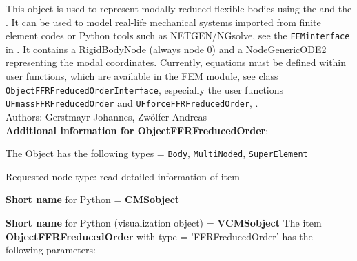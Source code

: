 \label{sec:item:ObjectFFRFreducedOrder}
This object is used to represent modally reduced flexible bodies using the  and the . It can be used to model real-life mechanical systems imported from finite element codes or Python tools such as NETGEN/NGsolve, see the \texttt{FEMinterface} in . It contains a RigidBodyNode (always node 0) and a NodeGenericODE2 representing the modal coordinates. Currently, equations must be defined within user functions, which are available in the FEM module, see class \texttt{ObjectFFRFreducedOrderInterface}, especially the user functions \texttt{UFmassFFRFreducedOrder} and \texttt{UFforceFFRFreducedOrder}, .\vspace{12pt}
 \\\noindent Authors: Gerstmayr Johannes, Zw\"olfer Andreas
\vspace{12pt}
 \\{\bf Additional information for ObjectFFRFreducedOrder}:
\bi
  \item The Object has the following types = \texttt{Body}, \texttt{MultiNoded}, \texttt{SuperElement}
  \item Requested node type: read detailed information of item
  \item {\bf Short name} for Python = {\bf CMSobject}  \item {\bf Short name} for Python (visualization object) = {\bf VCMSobject}\ei
\vspace{12pt} \noindent The item {\bf ObjectFFRFreducedOrder} with type = 'FFRFreducedOrder' has the following parameters:\vspace{-1cm}\\ 
